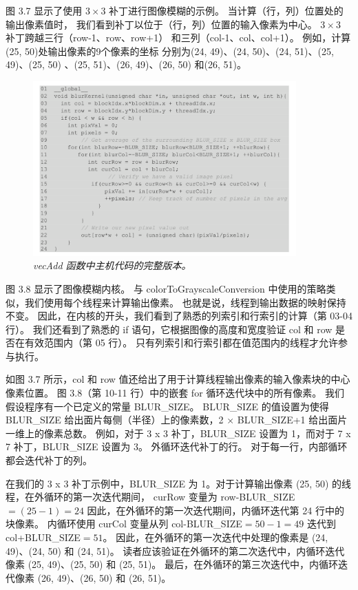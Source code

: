 图 3.7 显示了使用 $3 \times 3$ 补丁进行图像模糊的示例。 当计算（行，列）位置处的输出像素值时，
我们看到补丁以位于（行，列）位置的输入像素为中心。 $3 \times 3$ 补丁跨越三行（row-1、row、row+1）
和三列（col-1、col、col+1）。 例如，计算(25, 50)处输出像素的9个像素的坐标
分别为(24, 49)、(24, 50)、(24, 51)、(25, 49)、(25, 50) 、(25, 51)、(26, 49)、(26, 50) 和(26, 51)。

\begin{figure}[H]
	\centering
	\includegraphics[width=0.9\textwidth]{figs/F3.8.png}
	\caption{\textit{\color{red} vecAdd 函数中主机代码的完整版本。}}
\end{figure}

图 3.8 显示了图像模糊内核。 与 colorToGrayscaleConversion 中使用的策略类似，我们使用每个线程来计算输出像素。 
也就是说，线程到输出数据的映射保持不变。 因此，在内核的开头，我们看到了熟悉的列索引和行索引的计算（第 03-04 行）。 
我们还看到了熟悉的 if 语句，它根据图像的高度和宽度验证 col 和 row 是否在有效范围内（第 05 行）。 
只有列索引和行索引都在值范围内的线程才允许参与执行。

如图 3.7 所示，col 和 row 值还给出了用于计算线程输出像素的输入像素块的中心像素位置。 
图 3.8（第 10-11 行）中的嵌套 for 循环迭代块中的所有像素。 我们假设程序有一个已定义的常量 BLUR\_SIZE。 
BLUR\_SIZE 的值设置为使得 BLUR\_SIZE 给出面片每侧（半径）上的像素数，2 × BLUR\_SIZE+1 给出面片一维上的像素总数。 
例如，对于 3 x 3 补丁，BLUR\_SIZE 设置为 1，而对于 7 x 7 补丁，BLUR\_SIZE 设置为 3。
外循环迭代补丁的行。 对于每一行，内部循环都会迭代补丁的列。

在我们的 3 x 3 补丁示例中，BLUR\_SIZE 为 1。对于计算输出像素 (25, 50) 的线程，在外循环的第一次迭代期间，
curRow 变量为 row-BLUR\_SIZE$ = (25 - 1) = 24$ 因此，在外循环的第一次迭代期间，内循环迭代第 24 行中的块像素。
内循环使用 curCol 变量从列 col-BLUR\_SIZE$ = 50 - 1 = 49$ 迭代到 col+BLUR\_SIZE$ = 51$。 
因此，在外循环的第一次迭代中处理的像素是 (24, 49)、(24, 50) 和 (24, 51)。 
读者应该验证在外循环的第二次迭代中，内循环迭代像素 (25, 49)、(25, 50) 和 (25, 51)。 
最后，在外循环的第三次迭代中，内循环迭代像素 (26, 49)、(26, 50) 和 (26, 51)。

